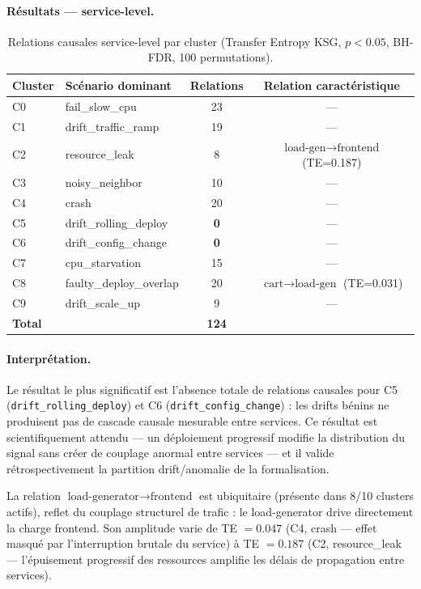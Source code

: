 \paragraph{Résultats --- service-level.}

\begin{table}[h]
\centering
\caption{Relations causales service-level par cluster (Transfer Entropy KSG, $p < 0.05$, BH-FDR, 100 permutations).}
\label{tab:ontology}
\begin{tabular}{llcc}
\toprule
\textbf{Cluster} & \textbf{Scénario dominant} & \textbf{Relations} & \textbf{Relation caractéristique} \\
\midrule
C0 & fail\_slow\_cpu        & 23 & --- \\
C1 & drift\_traffic\_ramp   & 19 & --- \\
C2 & resource\_leak         & 8  & $\text{load-gen} \to \text{frontend}$ (TE=0.187) \\
C3 & noisy\_neighbor        & 10 & --- \\
C4 & crash                  & 20 & --- \\
C5 & drift\_rolling\_deploy & \textbf{0}  & --- \\
C6 & drift\_config\_change  & \textbf{0}  & --- \\
C7 & cpu\_starvation        & 15 & --- \\
C8 & faulty\_deploy\_overlap & 20 & $\text{cart} \to \text{load-gen}$ (TE=0.031) \\
C9 & drift\_scale\_up        & 9  & --- \\
\midrule
\textbf{Total} & & \textbf{124} & \\
\bottomrule
\end{tabular}
\end{table}

\paragraph{Interprétation.}
Le résultat le plus significatif est l'absence totale de relations causales pour C5
(\texttt{drift\_rolling\_deploy}) et C6 (\texttt{drift\_config\_change}) : les drifts
bénins ne produisent pas de cascade causale mesurable entre services.
Ce résultat est scientifiquement attendu --- un déploiement progressif modifie la
distribution du signal sans créer de couplage anormal entre services --- et il valide
rétrospectivement la partition drift/anomalie de la formalisation.

La relation $\text{load-generator} \to \text{frontend}$ est ubiquitaire (présente dans
8/10 clusters actifs), reflet du couplage structurel de trafic : le load-generator
drive directement la charge frontend.
Son amplitude varie de TE $= 0.047$ (C4, crash --- effet masqué par l'interruption
brutale du service) à TE $= 0.187$ (C2, resource\_leak --- l'épuisement progressif
des ressources amplifie les délais de propagation entre services).

